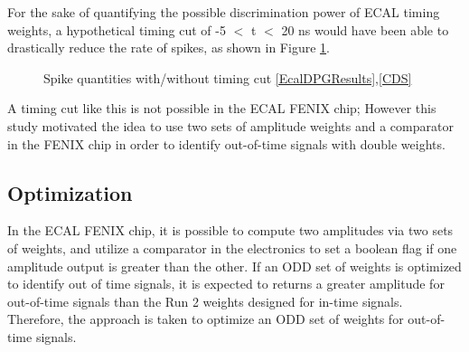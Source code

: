 For the sake of quantifying the possible discrimination power of ECAL timing weights, a hypothetical timing cut of -5 $<$ t $<$ 20 ns would have been able to drastically reduce the rate of spikes, as shown in Figure \ref{fig:TimingCutSpikeReduction}.

\begin{figure}[H]%
    \setcounter{subfigure}{0} %
    \centering
    \caption{Spike quantities with/without timing cut \href{https://twiki.cern.ch/twiki/bin/view/CMSPublic/EcalDPGResultsCMSDPS2019031}{[EcalDPGResults]},\href{https://cds.cern.ch/record/2690933/files/DP2019_031.pdf}{[CDS]}}%
    \label{fig:TimingCutSpikeReduction}
\end{figure}     

A timing cut like this is not possible in the ECAL FENIX chip; However this study motivated the idea to use two sets of amplitude weights and a comparator in the FENIX chip in order to identify out-of-time signals with double weights. 

\subsection{Optimization}

In the ECAL FENIX chip, it is possible to compute two amplitudes via two sets of weights, and utilize a comparator in the electronics to set a boolean flag if one amplitude output is greater than the other. If an ODD set of weights is optimized to identify out of time signals, it is expected to returns a greater amplitude for out-of-time signals than the Run 2 weights designed for in-time signals. Therefore, the approach is taken to optimize an ODD set of weights for out-of-time signals.

